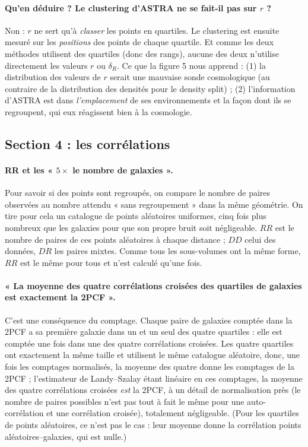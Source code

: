 \paragraph{Qu'en déduire ? Le clustering d'ASTRA ne se fait-il pas sur $r$ ?} Non : $r$ ne sert qu'à \emph{classer} les points en quartiles. Le clustering est ensuite mesuré sur les \emph{positions} des points de chaque quartile. Et comme les deux méthodes utilisent des quartiles (donc des rangs), aucune des deux n'utilise directement les valeurs $r$ ou $\delta_R$. Ce que la figure 5 nous apprend : (1) la distribution des valeurs de $r$ serait une mauvaise sonde cosmologique (au contraire de la distribution des densités pour le density split) ; (2) l'information d'ASTRA est dans \emph{l'emplacement} de ses environnements et la façon dont ils se regroupent, qui eux réagissent bien à la cosmologie.

\subsection{Section 4 : les corrélations}

\paragraph{RR et les « $5\times$ le nombre de galaxies ».} Pour savoir si des points sont regroupés, on compare le nombre de paires observées au nombre attendu « sans regroupement » dans la même géométrie. On tire pour cela un catalogue de points aléatoires uniformes, cinq fois plus nombreux que les galaxies pour que son propre bruit soit négligeable. $RR$ est le nombre de paires de ces points aléatoires à chaque distance ; $DD$ celui des données, $DR$ les paires mixtes. Comme tous les sous-volumes ont la même forme, $RR$ est le même pour tous et n'est calculé qu'une fois.

\paragraph{« La moyenne des quatre corrélations croisées des quartiles de galaxies est exactement la 2PCF ».} C'est une conséquence du comptage. Chaque paire de galaxies comptée dans la 2PCF a sa première galaxie dans un et un seul des quatre quartiles : elle est comptée une fois dans une des quatre corrélations croisées. Les quatre quartiles ont exactement la même taille et utilisent le même catalogue aléatoire, donc, une fois les comptages normalisés, la moyenne des quatre donne les comptages de la 2PCF ; l'estimateur de Landy--Szalay étant linéaire en ces comptages, la moyenne des quatre corrélations croisées \emph{est} la 2PCF, à un détail de normalisation près (le nombre de paires possibles n'est pas tout à fait le même pour une auto-corrélation et une corrélation croisée), totalement négligeable. (Pour les quartiles de points aléatoires, ce n'est pas le cas : leur moyenne donne la corrélation points aléatoires--galaxies, qui est nulle.)


